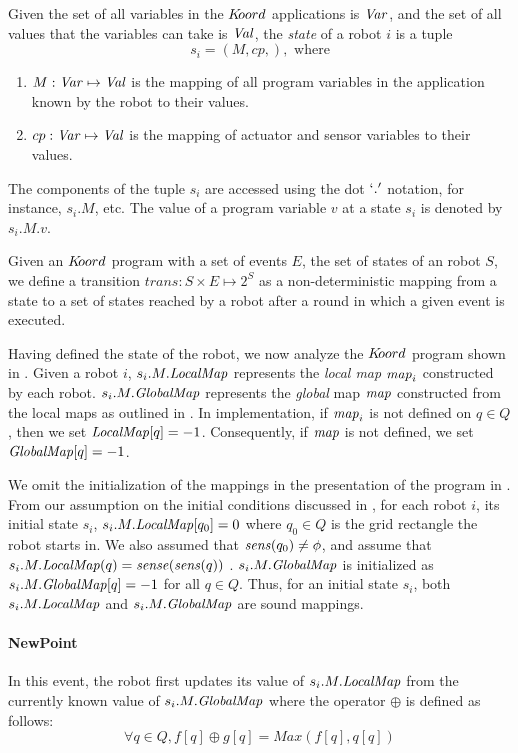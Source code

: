 \noindent
Given the set of all variables in the $K\kern-2pt oord$ applications is $\mathit{Var}$, and the set of all values that the variables can take is $\mathit{Val}$, the \emph{state} of a robot $i$ is a tuple $$s_i = ( M, cp,), \mbox{ where}$$
\begin{enumerate}
    \item $M : \mathit{Var} \mapsto \mathit{Val}$ is the mapping of all program variables in the application known by the robot to their values.
    \item $cp : \mathit{Var} \mapsto \mathit{Val}$ is the mapping of actuator and sensor variables to their values.
\end{enumerate}
The components of the tuple $s_i$ are accessed using the dot $`.'$ notation, for instance, $s_i.M$, etc. The value of a program variable $v$ at a state $s_i$ is denoted by $s_i.M.v$.

Given an $K\kern-2pt oord$ program with a set of events $E$, the set of states of an robot $S$, we define a transition $\mathit{trans}: S \times E \mapsto 2^S$ as a non-deterministic mapping from a state to a set of states reached by a robot after a round in which a given event is executed.

Having defined the state of the robot, we now analyze the $K\kern-2pt oord$ program shown in . Given a robot $i$, $s_i.M.\mathit{LocalMap}$ represents the \emph{local map} $\mathit{map}_i$ constructed by each robot. $s_i.M.\mathit{GlobalMap}$ represents the \emph{global} map $\mathit{map}$ constructed from the local maps as outlined in . In implementation, if $\mathit{map}_i$ is not defined on $q\in Q$, then we set $\mathit{LocalMap}[q] = -1$. Consequently, if $\mathit{map}$ is not defined, we set $\mathit{GlobalMap}[q] = -1$.


We omit the initialization of the mappings in the presentation of the program in . From our assumption on the initial conditions discussed in , for each robot $i$, its initial state $s_i$, $s_i.M.\mathit{LocalMap}[q_0] = 0$ where $q_0\in Q$ is the grid rectangle the robot starts in. We also assumed that $\mathit{sens}(q_0)\neq \phi$, and assume that $s_i.M.\mathit{LocalMap}(q) = \mathit{sense}(\mathit{sens}(q))$ . $s_i.M.\mathit{GlobalMap}$ is initialized as $s_i.M.\mathit{GlobalMap}[q] = -1$ for all $q\in Q$. Thus, for an initial state $s_i$, both $s_i.M.\mathit{LocalMap}$ and $s_i.M.\mathit{GlobalMap}$ are sound mappings.

\paragraph{NewPoint}
In this event, the robot first updates its value of $s_i.M.\mathit{LocalMap}$ from the currently known value of $s_i.M.\mathit{GlobalMap}$ where the operator $\oplus$ is defined as follows:
$$\forall q \in Q, f[q] \oplus g[q] = \mathit{Max}(f[q], q[q])$$

